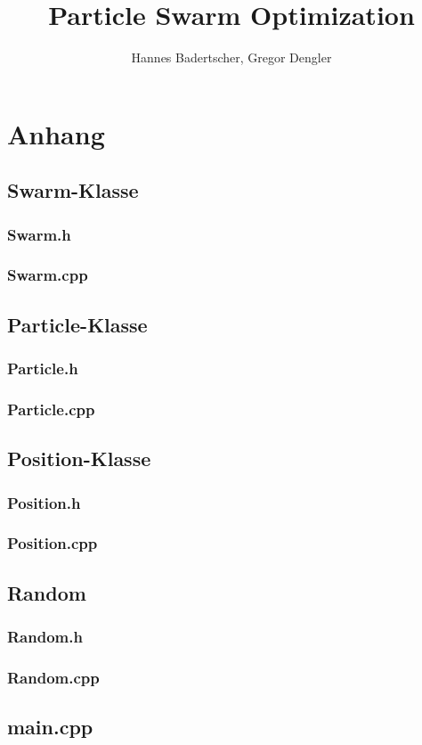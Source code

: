 \documentclass{article}
\title{Particle Swarm Optimization}
\author{Hannes Badertscher, Gregor Dengler}
\numberwithin{equation}{section}
\numberwithin{figure}{section}
\begin{document}
	
	
	
	
	
	
	
	
	
	
	\newpage
	
	
	
	\newpage
	\section{Anhang}
	\subsection{Swarm-Klasse}
	\subsubsection{Swarm.h}
	
	\newpage
	\subsubsection{Swarm.cpp}
	
	\newpage
	\subsection{Particle-Klasse}
	\subsubsection{Particle.h}
	
	\newpage
	\subsubsection{Particle.cpp}
	
	\newpage
	\subsection{Position-Klasse}
	\subsubsection{Position.h}
	
	\newpage
	\subsubsection{Position.cpp}
	
	\newpage
	\subsection{Random}
	\subsubsection{Random.h}
	
	\newpage
	\subsubsection{Random.cpp}
	
	\newpage
	\subsection{main.cpp}
	
	
\end{document}
